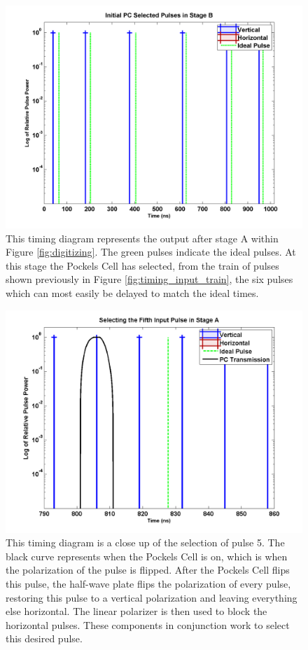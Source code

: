 \documentclass[pdftex,12pt,a4paper]{article}
\begin{document}
\begin{figure}[H]
\centering
\includegraphics[scale=0.5]{initialEOMOut.png} \caption{This timing diagram represents the output after stage A within Figure \ref{fig:digitizing}. The green pulses indicate the ideal pulses. At this stage the Pockels Cell has selected, from the train of pulses shown previously in Figure \ref{fig:timing_input_train}, the six pulses which can most easily be delayed to match the ideal times. 
}
\label{fig:timing_A}
\end{figure}


\begin{figure}[H]
\centering
\includegraphics[scale=0.5]{pulse5Selection.png} \caption{This timing diagram is a close up of the selection of pulse 5. The black curve represents when the Pockels Cell is on, which is when the polarization of the pulse is flipped. After the Pockels Cell flips this pulse, the half-wave plate flips the polarization of every pulse, restoring this pulse to a vertical polarization and leaving everything else horizontal. The linear polarizer is then used to block the horizontal pulses. These components in conjunction work to select this desired pulse. }
\label{fig:pulse5_A}
\end{figure}
\end{document}
